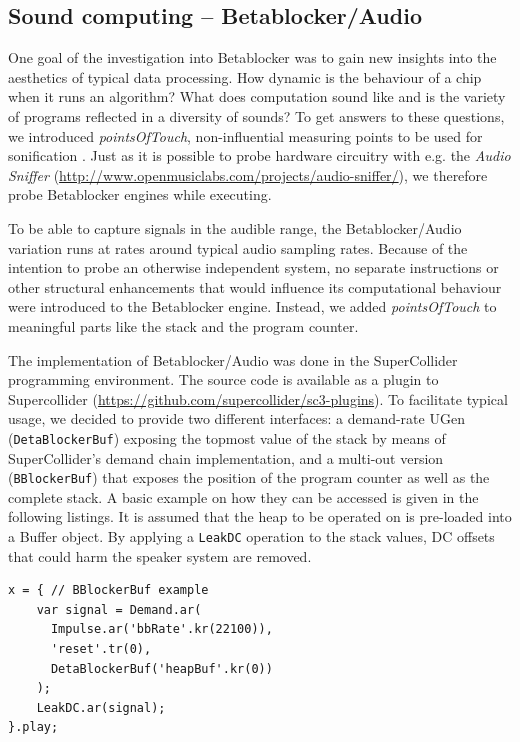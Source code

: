 \documentclass[letterpaper, 12pt]{article}
\begin{document}
\subsection{Sound computing -- Betablocker/Audio}
\label{sub:sound_computing}

One goal of the investigation into Betablocker was to gain new insights into the aesthetics of typical data processing.
How dynamic is the behaviour of a chip when it runs an algorithm?
What does computation sound like and is the variety of programs reflected in a diversity of sounds?
To get answers to these questions, we introduced \emph{pointsOfTouch}, non-influential measuring points to be used for sonification  \citep{bovermann2011-the}.
Just as it is possible to probe hardware circuitry with e.g. the \emph{Audio Sniffer}  (\url{http://www.openmusiclabs.com/projects/audio-sniffer/}), we therefore probe Betablocker engines while executing.

To be able to capture signals in the audible range, the Betablocker/Audio variation runs at rates around typical audio sampling rates.
Because of the intention to probe an otherwise independent system, no separate instructions or other structural enhancements that would influence its computational behaviour were introduced to the Betablocker engine.
Instead, we added \emph{pointsOfTouch} to meaningful parts like the stack and the program counter.

The implementation of Betablocker/Audio was done in the SuperCollider programming environment.
The source code is available as a plugin to Supercollider (\url{https://github.com/supercollider/sc3-plugins}).
To facilitate typical usage, we decided to provide two different interfaces: a demand-rate UGen (\texttt{DetaBlockerBuf}) exposing the topmost value of the stack by means of SuperCollider's demand chain implementation, and a multi-out version (\texttt{BBlockerBuf}) that exposes the position of the program counter as well as  the complete stack.
A basic example on how they can be accessed is given in the following listings.
It is assumed that the heap to be operated on is pre-loaded into a Buffer object.
By applying a \texttt{LeakDC} operation to the stack values, DC offsets that could harm the speaker system are removed.


\begin{Verbatim}[fontfamily=courier, xleftmargin=\parindent]
x = { // BBlockerBuf example
	var signal = Demand.ar(
	  Impulse.ar('bbRate'.kr(22100)),
	  'reset'.tr(0),
	  DetaBlockerBuf('heapBuf'.kr(0))
	);
	LeakDC.ar(signal);
}.play;
\end{Verbatim}
\end{document}
